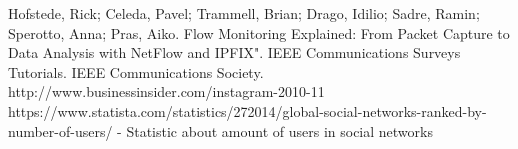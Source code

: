 \begin{thebibliography}{9}

Hofstede, Rick; Celeda, Pavel; Trammell, Brian; Drago, Idilio; Sadre, Ramin; Sperotto, Anna; Pras, Aiko. Flow Monitoring Explained: From Packet Capture to Data Analysis with NetFlow and IPFIX". IEEE Communications Surveys Tutorials. IEEE Communications Society.
http://www.businessinsider.com/instagram-2010-11
https://www.statista.com/statistics/272014/global-social-networks-ranked-by-number-of-users/ - Statistic about amount of users in social networks

\end{thebibliography}
